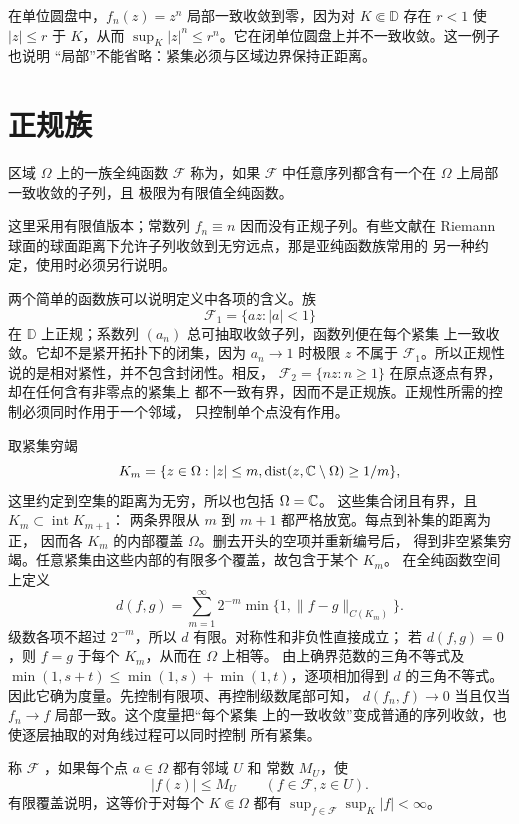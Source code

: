 在单位圆盘中，$f_n(z)=z^n$ 局部一致收敛到零，因为对
$K\Subset\mathbb D$ 存在 $r<1$ 使 $|z|\le r$ 于 $K$，从而
$\sup_K|z|^n\le r^n$。它在闭单位圆盘上并不一致收敛。这一例子也说明
“局部”不能省略：紧集必须与区域边界保持正距离。

\section{正规族}

\begin{definition}
区域 $\Omega$ 上的一族全纯函数 $\mathcal F$ 称为，如果
$\mathcal F$ 中任意序列都含有一个在 $\Omega$ 上局部一致收敛的子列，且
极限为有限值全纯函数。
\end{definition}

这里采用有限值版本；常数列 $f_n\equiv n$ 因而没有正规子列。有些文献在
Riemann 球面的球面距离下允许子列收敛到无穷远点，那是亚纯函数族常用的
另一种约定，使用时必须另行说明。

两个简单的函数族可以说明定义中各项的含义。族
\[
 \mathcal F_1=\{az:|a|<1\}
\]
在 $\mathbb D$ 上正规；系数列 $(a_n)$ 总可抽取收敛子列，函数列便在每个紧集
上一致收敛。它却不是紧开拓扑下的闭集，因为 $a_n\to1$ 时极限 $z$ 不属于
$\mathcal F_1$。所以正规性说的是相对紧性，并不包含封闭性。相反，
$\mathcal F_2=\{nz:n\ge1\}$ 在原点逐点有界，却在任何含有非零点的紧集上
都不一致有界，因而不是正规族。正规性所需的控制必须同时作用于一个邻域，
只控制单个点没有作用。

取紧集穷竭
\[
 K_m=\{z\in\Omega:|z|\le m,
 \operatorname{dist}(z,\mathbb{C}\setminus\Omega)\ge1/m\},
\]
这里约定到空集的距离为无穷，所以也包括 $\Omega=\mathbb{C}$。
这些集合闭且有界，且 $K_m\subset\operatorname{int}K_{m+1}$：
两条界限从 $m$ 到 $m+1$ 都严格放宽。每点到补集的距离为正，
因而各 $K_m$ 的内部覆盖 $\Omega$。删去开头的空项并重新编号后，
得到非空紧集穷竭。任意紧集由这些内部的有限多个覆盖，故包含于某个 $K_m$。
在全纯函数空间上定义
\[
 d(f,g)=\sum_{m=1}^{\infty}2^{-m}
 \min\{1,\|f-g\|_{C(K_m)}\}.
\]
级数各项不超过 $2^{-m}$，所以 $d$ 有限。对称性和非负性直接成立；
若 $d(f,g)=0$，则 $f=g$ 于每个 $K_m$，从而在 $\Omega$ 上相等。
由上确界范数的三角不等式及
$\min(1,s+t)\le\min(1,s)+\min(1,t)$，逐项相加得到 $d$ 的三角不等式。
因此它确为度量。先控制有限项、再控制级数尾部可知，
$d(f_n,f)\to0$ 当且仅当 $f_n\to f$ 局部一致。这个度量把“每个紧集
上的一致收敛”变成普通的序列收敛，也使逐层抽取的对角线过程可以同时控制
所有紧集。

称 $\mathcal F$ ，如果每个点 $a\in\Omega$ 都有邻域 $U$ 和
常数 $M_U$，使
\[
 |f(z)|\le M_U\qquad(f\in\mathcal F, z\in U).
\]
有限覆盖说明，这等价于对每个 $K\Subset\Omega$ 都有
$\sup_{f\in\mathcal F}\sup_K|f|<\infty$。


